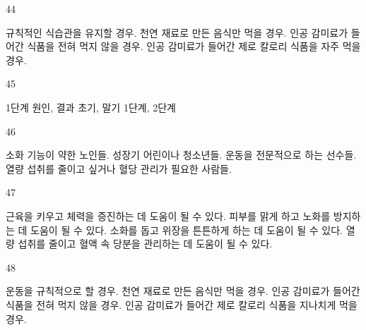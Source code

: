 \documentclass[fs9,seriesFre]{korfarm-base}
\begin{document}
\begin{kfSentenceUnit}{44}{}
\begin{kfChoices}
\kfChoice 규칙적인 식습관을 유지할 경우.
\kfChoice 천연 재료로 만든 음식만 먹을 경우.
\kfChoice 인공 감미료가 들어간 식품을 전혀 먹지 않을 경우.
\kfChoice 인공 감미료가 들어간 제로 칼로리 식품을 자주 먹을 경우.
\end{kfChoices}
\end{kfSentenceUnit}

\begin{kfSentenceUnit}{45}{}
\begin{kfChoices}
\kfChoice 1단계
\kfChoice 원인, 결과
\kfChoice 초기, 말기
\kfChoice 1단계, 2단계
\end{kfChoices}
\end{kfSentenceUnit}

\begin{kfSentenceUnit}{46}{}
\begin{kfChoices}
\kfChoice 소화 기능이 약한 노인들.
\kfChoice 성장기 어린이나 청소년들.
\kfChoice 운동을 전문적으로 하는 선수들.
\kfChoice 열량 섭취를 줄이고 싶거나 혈당 관리가 필요한 사람들.
\end{kfChoices}
\end{kfSentenceUnit}

\begin{kfSentenceUnit}{47}{}
\begin{kfChoices}
\kfChoice 근육을 키우고 체력을 증진하는 데 도움이 될 수 있다.
\kfChoice 피부를 맑게 하고 노화를 방지하는 데 도움이 될 수 있다.
\kfChoice 소화를 돕고 위장을 튼튼하게 하는 데 도움이 될 수 있다.
\kfChoice 열량 섭취를 줄이고 혈액 속 당분을 관리하는 데 도움이 될 수 있다.
\end{kfChoices}
\end{kfSentenceUnit}

\begin{kfSentenceUnit}{48}{}
\begin{kfChoices}
\kfChoice 운동을 규칙적으로 할 경우.
\kfChoice 천연 재료로 만든 음식만 먹을 경우.
\kfChoice 인공 감미료가 들어간 식품을 전혀 먹지 않을 경우.
\kfChoice 인공 감미료가 들어간 제로 칼로리 식품을 지나치게 먹을 경우.
\end{kfChoices}
\end{kfSentenceUnit}
\end{document}
